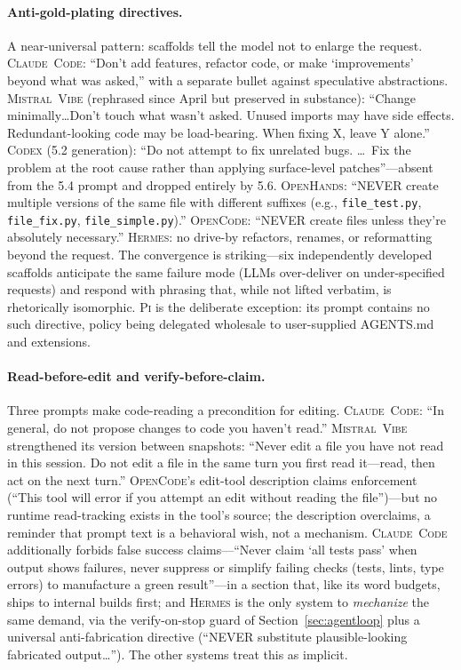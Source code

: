 \documentclass[11pt,a4paper]{article}
\newcommand{\clcode}{\textsc{Claude~Code}\xspace}
\newcommand{\cdx}{\textsc{Codex}\xspace}
\newcommand{\oh}{\textsc{OpenHands}\xspace}
\newcommand{\vibe}{\textsc{Mistral~Vibe}\xspace}
\newcommand{\hrm}{\textsc{Hermes}\xspace}
\newcommand{\pib}{\textsc{Pi}\xspace}
\newcommand{\ocd}{\textsc{OpenCode}\xspace}
\begin{document}
\paragraph{Anti-gold-plating directives.}
A near-universal pattern: scaffolds tell the model not to enlarge the request.
\clcode{}: ``Don't add features, refactor code, or make `improvements' beyond what was asked,'' with a separate bullet against speculative abstractions.
\vibe{} (rephrased since April but preserved in substance): ``Change minimally\ldots Don't touch what wasn't asked. Unused imports may have side effects. Redundant-looking code may be load-bearing. When fixing X, leave Y alone.''
\cdx{} (5.2 generation): ``Do not attempt to fix unrelated bugs. \dots\ Fix the problem at the root cause rather than applying surface-level patches''---absent from the 5.4 prompt and dropped entirely by 5.6.
\oh{}: ``NEVER create multiple versions of the same file with different suffixes (e.g., \texttt{file\_test.py}, \texttt{file\_fix.py}, \texttt{file\_simple.py}).''
\ocd{}: ``NEVER create files unless they're absolutely necessary.''
\hrm{}: no drive-by refactors, renames, or reformatting beyond the request.
The convergence is striking---six independently developed scaffolds anticipate the same failure mode (LLMs over-deliver on under-specified requests) and respond with phrasing that, while not lifted verbatim, is rhetorically isomorphic.
\pib{} is the deliberate exception: its prompt contains no such directive, policy being delegated wholesale to user-supplied AGENTS.md and extensions.

\paragraph{Read-before-edit and verify-before-claim.}
Three prompts make code-reading a precondition for editing.
\clcode{}: ``In general, do not propose changes to code you haven't read.''
\vibe{} strengthened its version between snapshots: ``Never edit a file you have not read in this session. Do not edit a file in the same turn you first read it---read, then act on the next turn.''
\ocd{}'s edit-tool description claims enforcement (``This tool will error if you attempt an edit without reading the file'')---but no runtime read-tracking exists in the tool's source; the description overclaims, a reminder that prompt text is a behavioral wish, not a mechanism.
\clcode{} additionally forbids false success claims---``Never claim `all tests pass' when output shows failures, never suppress or simplify failing checks (tests, lints, type errors) to manufacture a green result''---in a section that, like its word budgets, ships to internal builds first; and \hrm{} is the only system to \emph{mechanize} the same demand, via the verify-on-stop guard of Section~\ref{sec:agentloop} plus a universal anti-fabrication directive (``NEVER substitute plausible-looking fabricated output\ldots'').
The other systems treat this as implicit.
\end{document}
